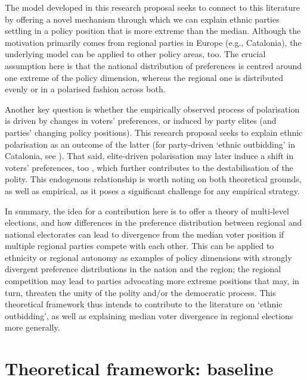 \documentclass[11pt]{article}
\begin{document}
The model developed in this research proposal seeks to connect to this literature by offering a novel mechanism through which we can explain ethnic parties settling in a policy position that is more extreme than the median. Although the motivation primarily comes from regional parties in Europe (e.g., Catalonia), the underlying model can be applied to other policy areas, too. The crucial assumption here is that the national distribution of preferences is centred around one extreme of the policy dimension, whereas the regional one is distributed evenly or in a polarised fashion across both.

Another key question is whether the empirically observed process of polarisation is driven by changes in voters' preferences, or induced by party elites (and parties' changing policy positions). This research proposal seeks to explain ethnic polarisation as an outcome of the latter (for party-driven `ethnic outbidding' in Catalonia, see \textcite{Barrio2017}). That said, elite-driven polarisation may later induce a shift in voters' preferences, too \parencite[p. 291]{Horowitz2000}, which further contributes to the destabilisation of the polity. This endogenous relationship is worth noting on both theoretical grounds, as well as empirical, as it poses a significant challenge for any empirical strategy.

In summary, the idea for a contribution here is to offer a theory of multi-level elections, and how differences in the preference distribution between regional and national electorates can lead to divergence from the median voter position if multiple regional parties compete with each other. This can be applied to ethnicity or regional autonomy as examples of policy dimensions with strongly divergent preference distributions in the nation and the region; the regional competition may lead to parties advocating more extreme positions that may, in turn, threaten the unity of the polity and/or the democratic process. This theoretical framework thus intends to contribute to the literature on `ethnic outbidding', as well as explaining median voter divergence in regional elections more generally.

\section{Theoretical framework: baseline}
\end{document}
